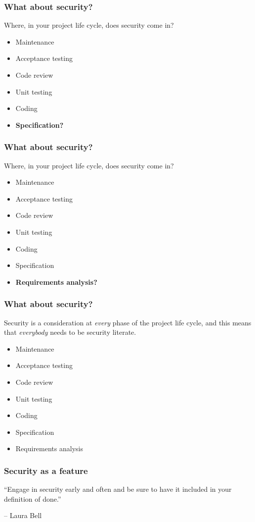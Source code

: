 \documentclass[10pt]{beamer}
\begin{document}
\begin{frame}
	\frametitle{What about security?}

	Where, in your project life cycle, does security come in?

	\begin{itemize}
		\item Maintenance
		\item Acceptance testing
		\item Code review
		\item Unit testing
		\item Coding
		\item \textbf{Specification?}
	\end{itemize}
\end{frame}
\begin{frame}
	\frametitle{What about security?}

	Where, in your project life cycle, does security come in?

	\begin{itemize}
		\item Maintenance
		\item Acceptance testing
		\item Code review
		\item Unit testing
		\item Coding
		\item Specification
		\item \textbf{Requirements analysis?}
	\end{itemize}
\end{frame}
\begin{frame}
	\frametitle{What about security?}

	Security is a consideration at \emph{every} phase of the project
	life cycle, and this means that \emph{everybody} needs to be 
	security literate.
	\begin{itemize}
		\item Maintenance
		\item Acceptance testing
		\item Code review
		\item Unit testing
		\item Coding
		\item Specification
		\item Requirements analysis
	\end{itemize}
\end{frame}
\begin{frame}
    \frametitle{Security as a feature}

    ``Engage in security early and often and be sure to have it included in your definition of done.''

    \vspace{10mm}
    -- Laura Bell
    \end{frame}
\end{document}
